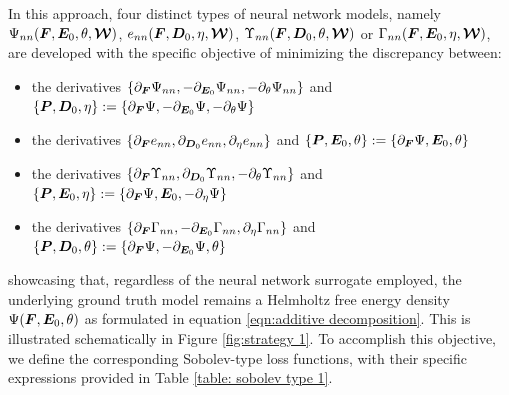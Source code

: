 In this approach, four distinct types of neural network models, namely $\Psi_{nn}(\boldsymbol{F},\boldsymbol{E}_0,\theta,\boldsymbol{\mathcal{W}})$, $e_{nn}(\boldsymbol{F},\boldsymbol{D}_0,\eta,\boldsymbol{\mathcal{W}})$, 
$\Upsilon_{nn}(\boldsymbol{F},\boldsymbol{D}_0,\theta,\boldsymbol{\mathcal{W}})$ or
$\Gamma_{nn}(\boldsymbol{F},\boldsymbol{E}_0,\eta,\boldsymbol{\mathcal{W}})$, are developed with the specific objective of minimizing the discrepancy between: 
%
\begin{itemize}
	\item  the derivatives  $\{\partial_{\boldsymbol{F}}\Psi_{nn},-\partial_{\boldsymbol{E}_0}\Psi_{nn},-\partial_{\theta}\Psi_{nn}\}$ and $\{\boldsymbol{P},\boldsymbol{D}_0,\eta\}:=\{\partial_{\boldsymbol{F}}\Psi,-\partial_{\boldsymbol{E}_0}\Psi,-\partial_{\theta}\Psi\}$
	\item  the derivatives  $\{\partial_{\boldsymbol{F}}e_{nn},\partial_{\boldsymbol{D}_0}e_{nn},\partial_{\eta}e_{nn}\}$ and $\{\boldsymbol{P},\boldsymbol{E}_0,\theta\}:=\{\partial_{\boldsymbol{F}}\Psi,{\boldsymbol{E}_0},\theta\}$
	\item  the derivatives  $\{\partial_{\boldsymbol{F}}\Upsilon_{nn},\partial_{\boldsymbol{D}_0}\Upsilon_{nn},-\partial_{\theta}\Upsilon_{nn}\}$ and $\{\boldsymbol{P},\boldsymbol{E}_0,\eta\}:=\{\partial_{\boldsymbol{F}}\Psi,{\boldsymbol{E}_0},-\partial_{\eta}\Psi\}$	
	\item  the derivatives  $\{\partial_{\boldsymbol{F}}\Gamma_{nn},-\partial_{\boldsymbol{E}_0}\Gamma_{nn},\partial_{\eta}\Gamma_{nn}\}$ and $\{\boldsymbol{P},\boldsymbol{D}_0,\theta\}:=\{\partial_{\boldsymbol{F}}\Psi,-\partial_{\boldsymbol{E}_0}\Psi,\theta\}$	
\end{itemize}
%
showcasing that, regardless of the neural network surrogate employed, the underlying ground truth model remains a Helmholtz free energy density $\Psi(\boldsymbol{F},\boldsymbol{E}_0,\theta)$ as formulated in equation \eqref{eqn:additive decomposition}. This is illustrated schematically in Figure \ref{fig:strategy 1}.
To accomplish this objective, we define the corresponding Sobolev-type loss functions, with their specific expressions provided in Table \ref{table: sobolev type 1}.

